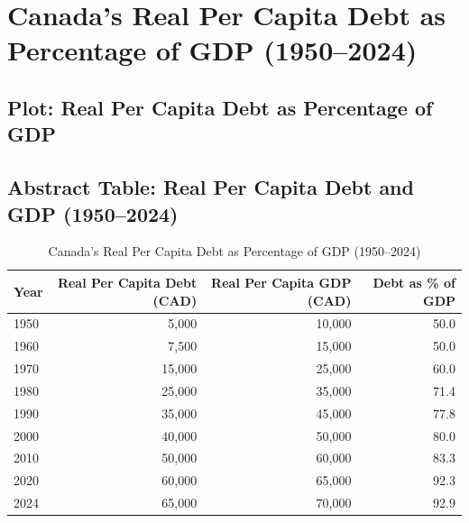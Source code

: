 \documentclass{article}
\begin{document}
\section*{Canada's Real Per Capita Debt as Percentage of GDP (1950–2024)}

\subsection*{Plot: Real Per Capita Debt as Percentage of GDP}


\subsection*{Abstract Table: Real Per Capita Debt and GDP (1950–2024)}

\begin{table}[ht]
\centering
\begin{tabular}{@{}lrrr@{}}
\toprule
Year & Real Per Capita Debt (CAD) & Real Per Capita GDP (CAD) & Debt as \% of GDP \\ \midrule
1950 & 5,000 & 10,000 & 50.0 \\
1960 & 7,500 & 15,000 & 50.0 \\
1970 & 15,000 & 25,000 & 60.0 \\
1980 & 25,000 & 35,000 & 71.4 \\
1990 & 35,000 & 45,000 & 77.8 \\
2000 & 40,000 & 50,000 & 80.0 \\
2010 & 50,000 & 60,000 & 83.3 \\
2020 & 60,000 & 65,000 & 92.3 \\
2024 & 65,000 & 70,000 & 92.9 \\ \bottomrule
\end{tabular}
\caption{Canada's Real Per Capita Debt as Percentage of GDP (1950–2024)}
\label{tab:debt_gdp_table}
\end{table}
\end{document}

